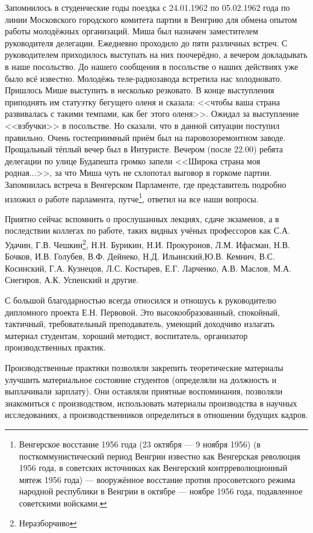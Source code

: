 Запомнилось в студенческие годы поездка с 24.01.1962 по 05.02.1962 года по линии Московского городского комитета партии в Венгрию для обмена опытом работы молодёжных организаций. Миша был назначен заместителем руководителя делегации. Ежедневно проходило до пяти различных встреч. С руководителем приходилось выступать на них поочерёдно, а вечером докладывать в наше посольство. До нашего сообщения в посольстве о наших действиях уже было всё известно. Молодёжь теле-радиозавода встретила нас холодновато. Пришлось Мише выступить в несколько резковато. В конце выступления приподнять им статуэтку бегущего оленя и сказала: <<чтобы ваша страна развивалась с такими темпами, как бег этого оленя>>. Ожидал за выступление <<взбучки>> в посольстве. Но сказали, что в данной ситуации поступил правильно. Очень гостеприимный приём был на паровозоремонтном заводе. Прощальный тёплый вечер был в Интуристе. Вечером (после 22.00) ребята делегации по улице Будапешта громко запели <<Широка страна моя родная...>>, за что Миша чуть не схлопотал выговор в горкоме партии. Запомнилась встреча в Венгерском Парламенте, где представитель подробно изложил о работе парламента, путче\footnote{Венгерское восстание 1956 года (23 октября — 9 ноября 1956) (в посткоммунистический период Венгрии известно как Венгерская революция 1956 года, в советских источниках как Венгерский контрреволюционный мятеж 1956 года) — вооружённое восстание против просоветского режима народной республики в Венгрии в октябре — ноябре 1956 года, подавленное советскими войсками.}, ответил на все наши вопросы.

Приятно сейчас вспомнить о прослушанных лекциях, сдаче экзаменов, а в последствии коллегах по работе, таких видных учёных профессоров как С.А. Удачин, Г.В. Чешкин\footnote{Неразборчиво}, Н.Н. Бурикин, Н.И. Прокуронов, Л.М. Ифасман, Н.В. Бочков, И.В. Голубев, В.Ф. Дейнеко, Н.Д. Ильинский,Ю.В. Кемнич, В.С. Косинский, Г.А. Кузнецов, Л.С. Костырев, Е.Г. Ларченко, А.В. Маслов, М.А. Снегиров, А.К. Успенский и другие.

С большой благодарностью всегда относился и отношусь к руководителю дипломного проекта Е.Н. Первовой. Это высокообразованный, спокойный, тактичный, требовательный преподаватель, умеющий доходчиво излагать материал студентам, хороший методист, воспитатель, организатор производственных практик.

Производственные практики позволяли закрепить теоретические материалы улучшить материальное состояние студентов (определяли на должность и выплачивали зарплату). Они оставляли приятные воспоминания, позволяли знакомиться с производством, использовать материалы производства в научных исследованиях, а производственников определиться в отношении будущих кадров.

